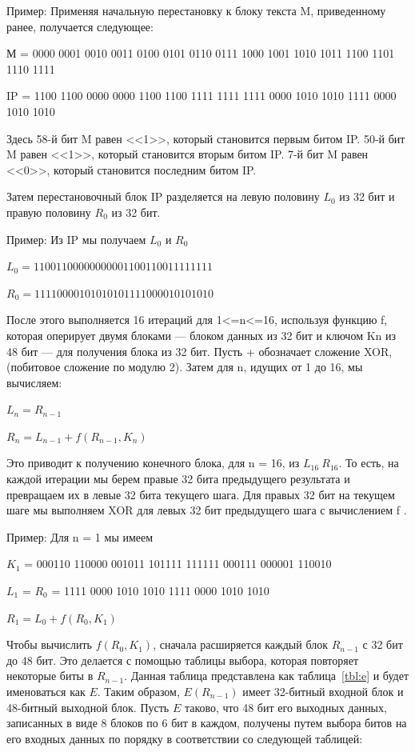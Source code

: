 Пример: Применяя начальную перестановку к блоку текста M, приведенному ранее, получается следующее:

М = 0000 0001 0010 0011 0100 0101 0110 0111 1000 1001 1010 1011 1100 1101 1110 1111

IP = 1100 1100 0000 0000 1100 1100 1111 1111 1111 0000 1010 1010 1111 0000 1010 1010

Здесь 58-й бит M равен <<1>>, который становится первым битом IP. 50-й бит M равен <<1>>, который становится вторым битом IP. 7-й бит M равен <<0>>, который становится последним битом IP.

Затем перестановочный блок IP разделяется на левую половину $L_{0}$ из 32 бит и правую половину $R_0$ из 32 бит.

Пример: Из IP мы получаем $L_0$ и $R_0$

$L_0 = 1100 1100 0000 0000 1100 1100 1111 1111$

$R_0 = 1111 0000 1010 1010 1111 0000 1010 1010$

После этого выполняется 16 итераций для 1<=n<=16, используя функцию f, которая оперирует двумя блоками --- блоком данных из 32 бит и ключом Kn из 48 бит --- для получения блока из 32 бит. 
Пусть + обозначает сложение XOR, (побитовое сложение по модулю 2). 
Затем для n, идущих от 1 до 16, мы вычисляем:

$L_n = R_{n-1}$

$R_n = L_{n-1} + f(R_{n-1},K_{n})$

Это приводит к получению конечного блока, для n = 16, из $L_{16}\ R_{16}$. То есть, на каждой итерации мы берем правые 32 бита предыдущего результата и превращаем их в левые 32 бита текущего шага. Для правых 32 бит на текущем шаге мы выполняем XOR для левых 32 бит предыдущего шага с вычислением f .

Пример: Для n = 1 мы имеем

$K_1$ = 000110 110000 001011 101111 111111 000111 000001 110010

$L_1$ = $R_0$ = 1111 0000 1010 1010 1111 0000 1010 1010

$R_1 = L_0 + f(R_0,K_1)$

Чтобы вычислить $f(R_0,K_1)$, сначала расширяется каждый блок $R_{n-1}$ с 32 бит до 48 бит. 
Это делается с помощью таблицы выбора, которая повторяет некоторые биты в $R_{n-1}$. 
Данная таблица представлена как таблица~\ref{tbl:e} и будет именоваться как $E$. 
Таким образом, $E(R_{n-1})$ имеет 32-битный входной блок и 48-битный выходной блок.
Пусть $E$ таково, что 48 бит его выходных данных, записанных в виде 8 блоков по 6 бит в каждом, получены путем выбора битов на его входных данных по порядку в соответствии со следующей таблицей:

